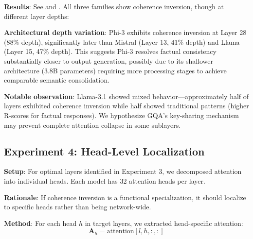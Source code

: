\documentclass[11pt,twocolumn]{article}
\begin{document}
\textbf{Results}: See  and . All three families show coherence inversion, though at different layer depths:

\begin{table}[h]
\centering
{}
\caption{Cross-architecture validation. All models exhibit coherence inversion with large effect sizes ($d$).}
\label{tab:cross_arch}
\end{table}

\textbf{Architectural depth variation}: Phi-3 exhibits coherence inversion at Layer 28 (88\% depth), significantly later than Mistral (Layer 13, 41\% depth) and Llama (Layer 15, 47\% depth). This suggests Phi-3 resolves factual consistency substantially closer to output generation, possibly due to its shallower architecture (3.8B parameters) requiring more processing stages to achieve comparable semantic consolidation.

\textbf{Notable observation}: Llama-3.1 showed mixed behavior---approximately half of layers exhibited coherence inversion while half showed traditional patterns (higher R-scores for factual responses). We hypothesize GQA's key-sharing mechanism may prevent complete attention collapse in some sublayers.

\subsection{Experiment 4: Head-Level Localization}

\textbf{Setup}: For optimal layers identified in Experiment 3, we decomposed attention into individual heads. Each model has 32 attention heads per layer.

\textbf{Rationale}: If coherence inversion is a functional specialization, it should localize to specific heads rather than being network-wide.

\textbf{Method}: For each head $h$ in target layers, we extracted head-specific attention:
\begin{equation}
\mathbf{A}_h = \text{attention}[l, h, :, :]
\end{equation}
\end{document}
